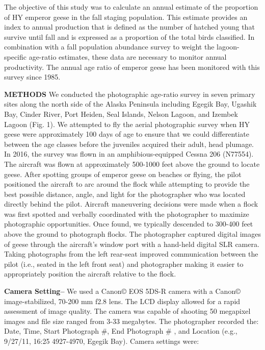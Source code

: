 \documentclass[]{article}
\begin{document}
The objective of this study was to calculate an annual estimate of the
proportion of HY emperor geese in the fall staging population. This
estimate provides an index to annual production that is defined as the
number of hatched young that survive until fall and is expressed as a
proportion of the total birds classified. In combination with a fall
population abundance survey to weight the lagoon-specific age-ratio
estimates, these data are necessary to monitor annual productivity. The
annual age ratio of emperor geese has been monitored with this survey
since 1985.

\textbf{METHODS}\break
We conducted the photographic age-ratio survey in seven primary sites
along the north side of the Alaska Peninsula including Egegik Bay,
Ugashik Bay, Cinder River, Port Heiden, Seal Islands, Nelson Lagoon, and
Izembek Lagoon (Fig. 1). We attempted to fly the aerial photographic
survey when HY geese were approximately 100 days of age to ensure that
we could differentiate between the age classes before the juveniles
acquired their adult, head plumage. In 2016, the survey was flown in an
amphibious-equipped Cessna 206 (N77554). The aircraft was flown at
approximately 500-1000 feet above the ground to locate geese. After
spotting groups of emperor geese on beaches or flying, the pilot
positioned the aircraft to arc around the flock while attempting to
provide the best possible distance, angle, and light for the
photographer who was located directly behind the pilot. Aircraft
maneuvering decisions were made when a flock was first spotted and
verbally coordinated with the photographer to maximize photographic
opportunities. Once found, we typically descended to 300-400 feet above
the ground to photograph flocks. The photographer captured digital
images of geese through the aircraft's window port with a hand-held
digital SLR camera. Taking photographs from the left rear-seat improved
communication between the pilot (i.e., seated in the left front seat)
and photographer making it easier to appropriately position the aircraft
relative to the flock.

\textbf{Camera Setting--} We used a Canon\copyright\hspace{1ex} EOS
5DS-R camera with a Canon\copyright\hspace{1ex} image-stabilized, 70-200
mm f2.8 lens. The LCD display allowed for a rapid assessment of image
quality. The camera was capable of shooting 50 megapixel images and file
size ranged from 3-33 megabytes. The photographer recorded the: Date,
Time, Start Photograph \#, End Photograph \# , and Location (e.g.,
9/27/11, 16:25 4927-4970, Egegik Bay). Camera settings were:
\end{document}

